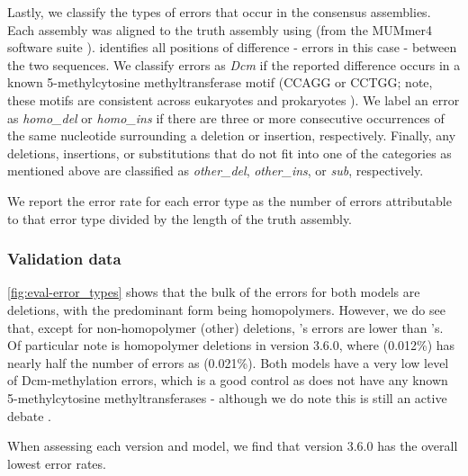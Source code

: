 Lastly, we classify the types of errors that occur in the consensus assemblies. Each  assembly was aligned to the truth assembly using  (from the MUMmer4 software suite \cite{mummer2018}).  identifies all positions of difference - errors in this case - between the two sequences. We classify errors as \emph{Dcm} if the reported difference occurs in a known 5-methylcytosine methyltransferase motif (CCAGG or CCTGG; note, these motifs are consistent across eukaryotes and prokaryotes \cite{Clark2013enchanced}). We label an error as \emph{homo\_del} or \emph{homo\_ins} if there are three or more consecutive occurrences of the same nucleotide surrounding a deletion or insertion, respectively. Finally, any deletions, insertions, or substitutions that do not fit into one of the categories as mentioned above are classified as \emph{other\_del}, \emph{other\_ins}, or \emph{sub}, respectively.

We report the error rate for each error type as the number of errors attributable to that error type divided by the length of the truth assembly.

\subsubsection{Validation data}

\autoref{fig:eval-error_types} shows that the bulk of the errors for both models are deletions, with the predominant form being homopolymers. However, we do see that, except for non-homopolymer (other) deletions, \tubby{}'s errors are lower than \guppy{}'s. Of particular note is homopolymer deletions in version 3.6.0, where \tubby{} (0.012\%) has nearly half the number of errors as \guppy{} (0.021\%). Both models have a very low level of Dcm-methylation errors, which is a good control as \mtb{} does not have any known 5-methylcytosine methyltransferases - although we do note this is still an active debate \cite{Danjuma2017}.

When assessing each version and model, we find that \tubby{} version 3.6.0 has the overall lowest error rates.

